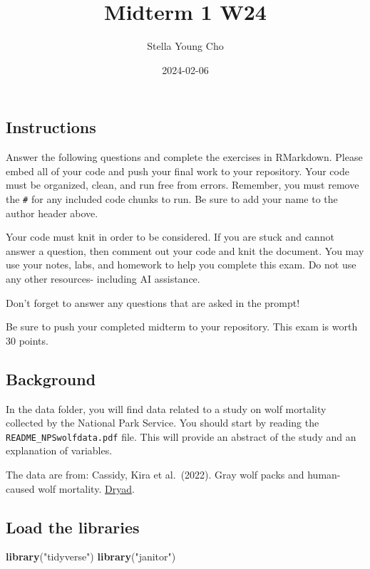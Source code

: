 \documentclass[
]{article}
\title{Midterm 1 W24}
\author{Stella Young Cho}
\date{2024-02-06}
\newenvironment{Shaded}{\begin{snugshade}}{\end{snugshade}}
\newcommand{\FunctionTok}[1]{\textcolor[rgb]{0.13,0.29,0.53}{\textbf{#1}}}
\newcommand{\NormalTok}[1]{#1}
\newcommand{\StringTok}[1]{\textcolor[rgb]{0.31,0.60,0.02}{#1}}
\begin{document}
\maketitle

\hypertarget{instructions}{%
\subsection{Instructions}\label{instructions}}

Answer the following questions and complete the exercises in RMarkdown.
Please embed all of your code and push your final work to your
repository. Your code must be organized, clean, and run free from
errors. Remember, you must remove the \texttt{\#} for any included code
chunks to run. Be sure to add your name to the author header above.

Your code must knit in order to be considered. If you are stuck and
cannot answer a question, then comment out your code and knit the
document. You may use your notes, labs, and homework to help you
complete this exam. Do not use any other resources- including AI
assistance.

Don't forget to answer any questions that are asked in the prompt!

Be sure to push your completed midterm to your repository. This exam is
worth 30 points.

\hypertarget{background}{%
\subsection{Background}\label{background}}

In the data folder, you will find data related to a study on wolf
mortality collected by the National Park Service. You should start by
reading the \texttt{README\_NPSwolfdata.pdf} file. This will provide an
abstract of the study and an explanation of variables.

The data are from: Cassidy, Kira et al.~(2022). Gray wolf packs and
human-caused wolf mortality.
\href{https://doi.org/10.5061/dryad.mkkwh713f}{Dryad}.

\hypertarget{load-the-libraries}{%
\subsection{Load the libraries}\label{load-the-libraries}}

\begin{Shaded}
\begin{Highlighting}[]
\FunctionTok{library}\NormalTok{(}\StringTok{"tidyverse"}\NormalTok{)}
\FunctionTok{library}\NormalTok{(}\StringTok{"janitor"}\NormalTok{)}
\end{Highlighting}
\end{Shaded}
\end{document}
